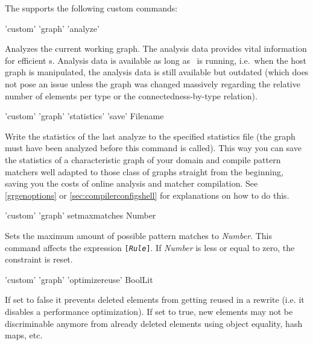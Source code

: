 The  supports the following custom commands:

\begin{rail}
  'custom' 'graph' 'analyze'
\end{rail}
Analyzes the current working graph.
The analysis data provides vital information for efficient s.
Analysis data is available as long as \GrShell\ is running, i.e.\ when the host graph is manipulated, the analysis data is still available but outdated (which does not pose an issue unless the graph was changed massively regarding the relative number of elements per type or the connectedness-by-type relation).

\begin{rail}
  'custom' 'graph' 'statistics' 'save' Filename
\end{rail}
Write the statistics of the last analyze to the specified statistics file (the graph must have been analyzed before this command is called).
This way you can save the statistics of a characteristic graph of your domain and compile pattern matchers well adapted to those class of graphs straight from the beginning, saving you the costs of online analysis and matcher compilation.
See \ref{grgenoptions} or \ref{sec:compilerconfigshell} for explanations on how to do this.

\begin{rail}
  'custom' 'graph' setmaxmatches Number
\end{rail}
Sets the maximum amount of possible pattern matches to \emph{Number}.
This command affects the expression \texttt{[\emph{Rule}]}.
If \emph{Number} is less or equal to zero, the constraint is reset.

\begin{rail}
  'custom' 'graph' 'optimizereuse' BoolLit
\end{rail}
If set to false it prevents deleted elements from getting reused in a rewrite (i.e. it disables a performance optimization).
If set to true, new elements may not be discriminable anymore from already deleted elements using object equality, hash maps, etc.

